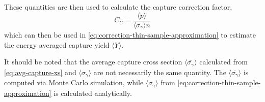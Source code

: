 These quantities are then used to calculate the capture correction factor,
\begin{equation}
    \label{eq:capture-correction-factor-calc}
    C_{C} = \frac{\langle p \rangle }{\langle \overline{ \sigma_{\gamma} } \rangle n}
\end{equation}
which can then be used in \autoref{eq:correction-thin-sample-approximation} to estimate the energy averaged capture yield $\langle Y \rangle$. 

It should be noted that the average capture cross section $\langle \overline{\sigma_{\gamma}} \rangle$ calculated from \autoref{eq:avg-capture-xs} and $\langle \sigma_{\gamma} \rangle$ are not necessarily the same quantity. The $\langle \overline{\sigma_{\gamma}} \rangle$ is computed via Monte Carlo simulation, while $\langle \sigma_{\gamma} \rangle$ from \autoref{eq:correction-thin-sample-approximation} is calculated analytically.